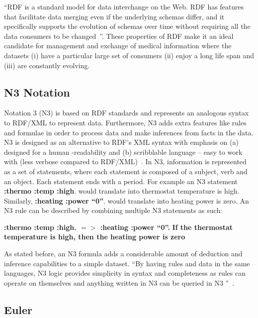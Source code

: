 \documentclass[conference]{IEEEtran}
\begin{document}
“RDF is a standard model for data interchange on the Web. RDF has features that facilitate data merging even if the underlying schemas differ, and it
specifically supports the evolution of schemas over time without requiring all the data consumers to be changed~\cite{rdfsite}”.  These properties of RDF make
it an ideal candidate for management and exchange of medical information where the datasets (i) have a particular large set of consumers (ii)
enjoy a long life span and (iii) are constantly evolving.

\subsection{N3 Notation}

Notation 3 (N3) is based on RDF standards and represents an analogous syntax to RDF/XML to represent data.  Furthermore, N3 adds extra features like rules and
formulae in
order to process data and make inferences from facts in the data.  N3 is designed as an alternative to RDF's XML syntax with emphasis on (a) designed for a
human -readability and (b) scribblable language – easy to work with (less verbose compared to RDF/XML)~\cite{notation3}.  In N3, information is represented as a
set of statements, where each statement is composed of a subject, verb and an object. Each statement ends with a period.
For example an N3 statement \textbf{{:thermo :temp :high}}. would translate into thermostat temperature is high. Similarly, \textbf{{:heating :power “0”}}.
would translate into heating power is zero.  An N3 rule can be described by combining multiple N3 statements as such:

\begin{center}
\textbf{{:thermo :temp :high}. $=>$ {:heating :power “0”}.}\newline
\textbf{If the thermostat temperature is high, then the heating power is zero}
\end{center}


As stated before, an N3 formula adds a considerable amount of deduction and inference capabilities to a simple dataset.  “By having rules and data in the same
languages, N3 logic provides simplicity in syntax and completeness as rules can operate on themselves and anything written in N3 can be queried in N3
”~\cite{berners-lee2008}.


\subsection{Euler}
\end{document}

